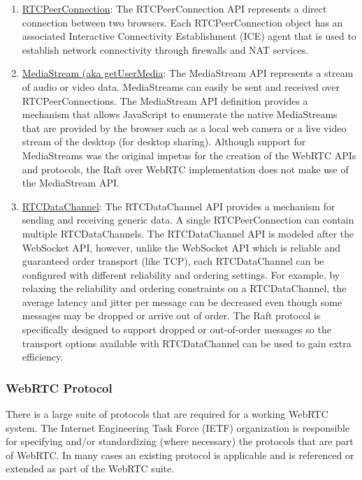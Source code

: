 \documentclass{acmtog} %
\begin{document}
\begin{enumerate}
\item \href{http://www.w3.org/TR/webrtc/\#rtcpeerconnection-interface}{RTCPeerConnection}: The RTCPeerConnection API represents a direct connection between two browsers. Each RTCPeerConnection object has an associated Interactive Connectivity Establishment (ICE) agent that is used to establish network connectivity through firewalls and NAT services.

\item \href{http://www.w3.org/TR/webrtc/\#media-stream-api-extensions-for-network-use}{MediaStream (aka getUserMedia}: The MediaStream API represents a stream of audio or video data.  MediaStreams can easily be sent and received over RTCPeerConnections. The MediaStream API definition provides a mechanism that allows JavaScript to enumerate the native MediaStreams that are provided by the browser such as a local web camera or a live video stream of the desktop (for desktop sharing).  Although support for MediaStreams was the original impetus for the creation of the WebRTC APIs and protocols, the Raft over WebRTC implementation does not make use of the MediaStream API.

\item \href{http://www.w3.org/TR/webrtc/\#rtcdatachannel}{RTCDataChannel}: The RTCDataChannel API provides a mechanism for sending and receiving generic data. A single RTCPeerConnection can contain multiple RTCDataChannels. The RTCDataChannel API is modeled after the WebSocket API, however, unlike the WebSocket API which is reliable and guaranteed order transport (like TCP), each RTCDataChannel can be configured with different reliability and ordering settings. For example, by relaxing the reliability and ordering constraints on a RTCDataChannel, the average latency and jitter per message can be decreased even though some messages may be dropped or arrive out of order. The Raft protocol is specifically designed to support dropped or out-of-order messages so the transport options available with RTCDataChannel can be used to gain extra efficiency.
\end{enumerate}


\subsubsection{WebRTC Protocol}

There is a large suite of protocols that are required for a working
WebRTC system. The Internet Engineering Task Force (IETF) organization
is responsible for specifying and/or standardizing (where necessary)
the protocols that are part of WebRTC. In many cases an existing
protocol is applicable and is referenced or extended as part of the
WebRTC suite.
\end{document}

